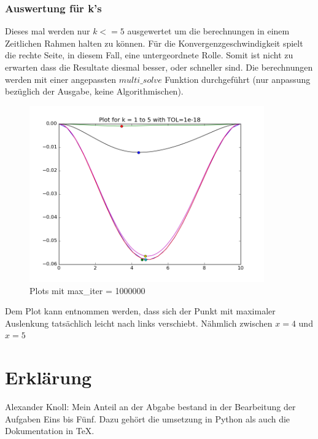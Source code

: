 \documentclass[12pt,titlepage]{article}
\begin{document}
	 	\subsubsection{Auswertung für k's}
	 		Dieses mal werden nur $k<=5$ ausgewertet um die berechnungen in einem Zeitlichen Rahmen halten zu können. Für die Konvergenzgeschwindigkeit spielt die rechte Seite, 
	 		in diesem Fall, eine untergeordnete Rolle. Somit ist nicht zu erwarten dass die Resultate diesmal besser, oder schneller sind. Die berechnungen werden mit einer
	 		angepassten $multi\_solve$ Funktion durchgeführt (nur anpassung bezüglich der Ausgabe, keine Algorithmischen).
		\begin{figure}[H] 
	 		\centering
	 		\includegraphics[width=0.9\textwidth]{extra_k.png}
	 		\caption{Plots mit max\_iter = 1000000}
	 		\label{fig:Bild6}
	 	\end{figure}
	 	Dem Plot kann entnommen werden, dass sich der Punkt mit maximaler Auslenkung tatsächlich leicht nach links verschiebt. Nähmlich zwischen $x=4$ und $x=5$

\newpage
\section{Erklärung}
	Alexander Knoll: Mein Anteil an der Abgabe bestand in der Bearbeitung der Aufgaben Eins bis Fünf. Dazu gehört die umsetzung in Python als auch die Dokumentation in TeX.

%
%



\end{document}
